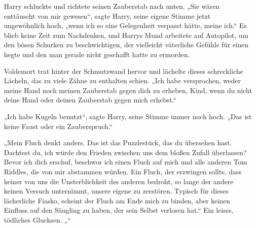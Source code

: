 Harry schluckte und richtete seinen Zauberstab nach unten.
„Sie wären enttäuscht von mir gewesen“, sagte Harry, seine eigene Stimme jetzt ungewöhnlich hoch, „wenn ich so eine Gelegenheit verpasst hätte, meine ich.“
Es blieb keine Zeit zum Nachdenken, und Harrys Mund arbeitete auf Autopilot, um den bösen Schurken zu beschwichtigen, der vielleicht väterliche Gefühle für einen hegte und den man gerade nicht geschafft hatte zu ermorden.

Voldemort trat hinter der Schmutzwand hervor und lächelte dieses schreckliche Lächeln, das zu viele Zähne zu enthalten schien.
„Ich habe versprochen, weder meine Hand noch meinen Zauberstab gegen dich zu erheben, Kind, wenn du nicht deine Hand oder deinen Zauberstab gegen mich erhebst.“

„Ich habe Kugeln benutzt“, sagte Harry, seine Stimme immer noch hoch.
„Das ist keine Faust oder ein Zauberspruch.“

„Mein Fluch denkt anders. Das ist das Puzzlestück, das du übersehen hast. Dachtest du, ich würde den Frieden zwischen uns dem bloßen Zufall überlassen? Bevor ich dich erschuf, beschwor ich einen Fluch auf mich und alle anderen Tom Riddles, die von mir abstammen würden. Ein Fluch, der erzwingen sollte, dass keiner von uns die Unsterblichkeit des anderen bedroht, so lange der andere keinen Versuch unternimmt, unsere eigene zu zerstören. Typisch für dieses lächerliche Fiasko, scheint der Fluch am Ende mich zu binden, aber keinen Einfluss auf den Säugling zu haben, der sein Selbst verloren hat.“
Ein leises, tödliches Glucksen.
„“

